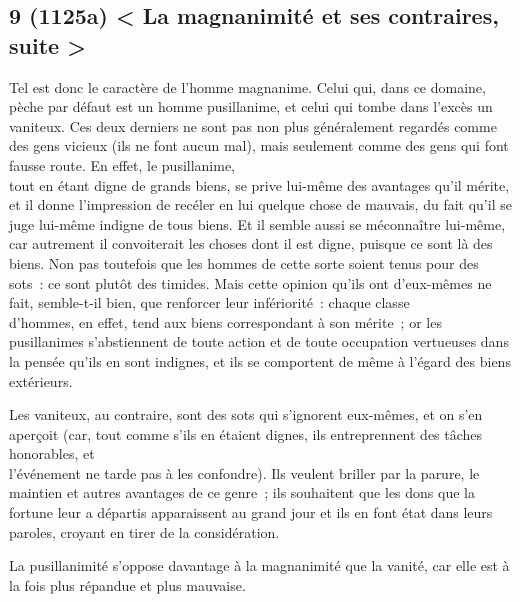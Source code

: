 \documentclass[french,twoside]{book} %
\begin{document}
\subsection[{9 (1125a) < La magnanimité et ses contraires, suite >}]{9 (1125a) < La magnanimité et ses contraires, suite >}
\noindent Tel est donc le caractère de l’homme magnanime. Celui qui, dans ce domaine, pèche par défaut est un homme pusillanime, et celui qui tombe dans l’excès un vaniteux. Ces deux derniers ne sont pas non plus généralement regardés comme des gens vicieux (ils ne font aucun mal), mais seulement comme des gens qui font fausse route. En effet, le pusillanime, \\
tout en étant digne de grands biens, se prive lui-même des avantages qu’il mérite, et il donne l’impression de recéler en lui quelque chose de mauvais, du fait qu’il se juge lui-même indigne de tous biens. Et il semble aussi se méconnaître lui-même, car autrement il convoiterait les choses dont il est digne, puisque ce sont là des biens. Non pas toutefois que les hommes de cette sorte soient tenus pour des sots : ce sont plutôt des timides. Mais cette opinion qu’ils ont d’eux-mêmes ne fait, semble-t-il bien, que renforcer leur infériorité : chaque classe \\
d’hommes, en effet, tend aux biens correspondant à son mérite ; or les pusillanimes s’abstiennent de toute action et de toute occupation vertueuses dans la pensée qu’ils en sont indignes, et ils se comportent de même à l’égard des biens extérieurs.\par
Les vaniteux, au contraire, sont des sots qui s’ignorent eux-mêmes, et on s’en aperçoit (car, tout comme s’ils en étaient dignes, ils entreprennent des tâches honorables, et \\
l’événement ne tarde pas à les confondre). Ils veulent briller par la parure, le maintien et autres avantages de ce genre ; ils souhaitent que les dons que la fortune leur a départis apparaissent au grand jour et ils en font état dans leurs paroles, croyant en tirer de la considération.\par
La pusillanimité s’oppose davantage à la magnanimité que la vanité, car elle est à la fois plus répandue et plus mauvaise.
\end{document}
